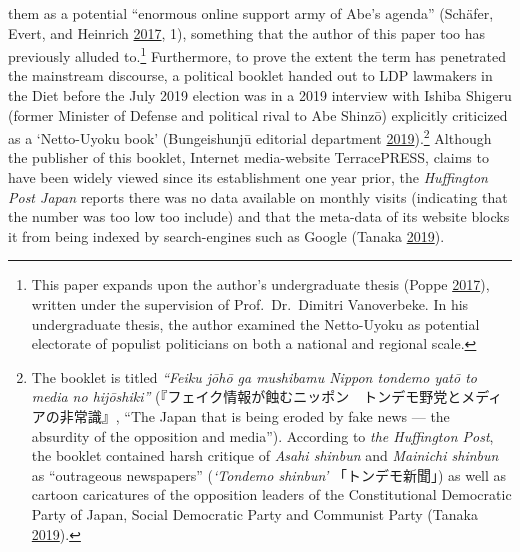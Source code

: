 \documentclass[10pt,british,A4paper,oneside]{memoir}
\begin{document}
them as a potential ``enormous online support army of Abe's agenda''
(Schäfer, Evert, and Heinrich
\protect\hyperlink{ref-schafer_japans_2017}{2017}, 1), something that
the author of this paper too has previously alluded to.\footnote{This
  paper expands upon the author's undergraduate thesis (Poppe
  \protect\hyperlink{ref-poppe_digitaal_2017}{2017}), written under the
  supervision of Prof.~Dr.~Dimitri Vanoverbeke. In his undergraduate
  thesis, the author examined the Netto-Uyoku as potential electorate of
  populist politicians on both a national and regional scale.}
Furthermore, to prove the extent the term has penetrated the mainstream
discourse, a political booklet handed out to LDP lawmakers in the Diet
before the July 2019 election was in a 2019 interview with Ishiba
Shigeru (former Minister of Defense and political rival to Abe Shinzō)
explicitly criticized as a `Netto-Uyoku book' (Bungeishunjū editorial
department
\protect\hyperlink{ref-bungeishunju_editorial_department_eng._2019}{2019}).\footnote{The
  booklet is titled \emph{``Feiku jōhō ga mushibamu Nippon tondemo yatō
  to media no hijōshiki''}
  (『フェイク情報が蝕むニッポン　トンデモ野党とメディアの非常識』, ``The
  Japan that is being eroded by fake news --- the absurdity of the
  opposition and media''). According to \emph{the Huffington Post}, the
  booklet contained harsh critique of \emph{Asahi shinbun} and
  \emph{Mainichi shinbun} as ``outrageous newspapers'' (\emph{`Tondemo
  shinbun'} 「トンデモ新聞」) as well as cartoon caricatures of the
  opposition leaders of the Constitutional Democratic Party of Japan,
  Social Democratic Party and Communist Party (Tanaka
  \protect\hyperlink{ref-tanaka_eng._2019}{2019}).} Although the
publisher of this booklet, Internet media-website TerracePRESS, claims
to have been widely viewed since its establishment one year prior, the
\emph{Huffington Post Japan} reports there was no data available on
monthly visits (indicating that the number was too low too include) and
that the meta-data of its website blocks it from being indexed by
search-engines such as Google (Tanaka
\protect\hyperlink{ref-tanaka_eng._2019}{2019}).
\end{document}

